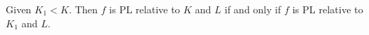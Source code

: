 Given $K_1 < K$. Then $f$ is PL relative to $K$ and $L$ if and only if $f$ is PL relative to $K_1$ and $L$.
